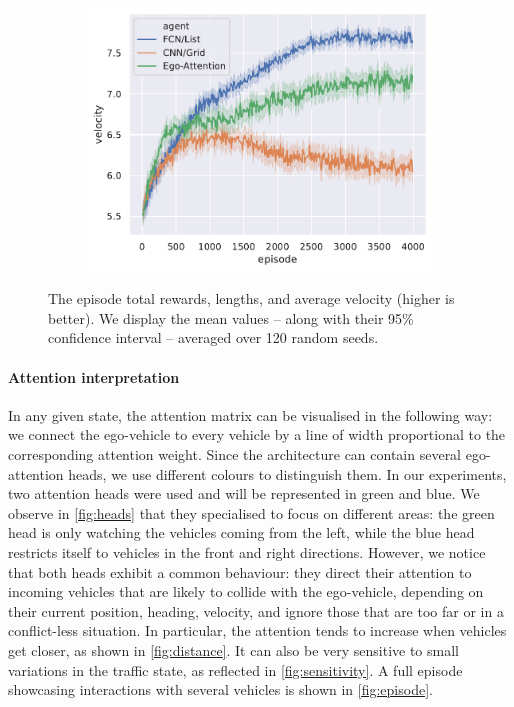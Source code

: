 \begin{figure}[htp]
\begin{subfigure}[b]{0.49\linewidth}
		\includegraphics[width=\linewidth]{img/velocity}
	\end{subfigure}
	\caption{The episode total rewards, lengths, and average velocity (higher is better). We display the mean values -- along with their 95\% confidence interval -- averaged over 120 random seeds.}
	\label{fig:attention-results}
\end{figure}

\paragraph{Attention interpretation}

In any given state, the attention matrix can be visualised in the following way: we connect the ego-vehicle to every vehicle by a line of width proportional to the corresponding attention weight. Since the architecture can contain several ego-attention heads, we use different colours to distinguish them. In our experiments, two attention heads were used and will be represented in green and blue. We observe in \autoref{fig:heads} that they specialised to focus on different areas: the green head is only watching the vehicles coming from the left, while the blue head restricts itself to vehicles in the front and right directions. However, we notice that both heads exhibit a common behaviour: they direct their attention to incoming vehicles that are likely to collide with the ego-vehicle, depending on their current position, heading, velocity, and ignore those that are too far or in a conflict-less situation. In particular, the attention tends to increase when vehicles get closer, as shown in \autoref{fig:distance}. It can also be very sensitive to small variations in the traffic state, as reflected in \autoref{fig:sensitivity}. A full episode showcasing interactions with several vehicles is shown in \autoref{fig:episode}.


